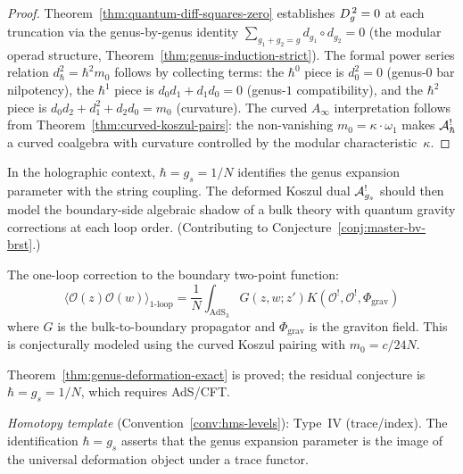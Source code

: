 \begin{proof}
Theorem~\ref{thm:quantum-diff-squares-zero} establishes
$D_{g}^{\,2} = 0$ at each truncation via the genus-by-genus
identity $\sum_{g_1+g_2=g} d_{g_1} \circ d_{g_2} = 0$
(the modular operad structure,
Theorem~\ref{thm:genus-induction-strict}).  The formal
power series relation $d_\hbar^2 = \hbar^2 m_0$ follows
by collecting terms: the $\hbar^0$ piece is $d_0^2 = 0$
(genus-$0$ bar nilpotency), the $\hbar^1$ piece is
$d_0 d_1 + d_1 d_0 = 0$ (genus-$1$ compatibility), and
the $\hbar^2$ piece is
$d_0 d_2 + d_1^2 + d_2 d_0 = m_0$ (curvature).  The
curved $A_\infty$ interpretation follows from
Theorem~\ref{thm:curved-koszul-pairs}: the
non-vanishing $m_0 = \kappa \cdot \omega_1$ makes
$\mathcal{A}^!_\hbar$ a curved coalgebra with curvature
controlled by the modular characteristic~$\kappa$.
\end{proof}

\begin{conjecture}
\label{conj:loop-string-coupling}
In the holographic context, $\hbar = g_s = 1/N$
identifies the genus expansion parameter with the string
coupling.  The deformed Koszul dual
$\mathcal{A}^!_{g_s}$ should then model the boundary-side algebraic shadow of a
bulk theory with quantum gravity corrections at each loop order.
(Contributing to Conjecture~\ref{conj:master-bv-brst}.)
\end{conjecture}

\begin{example}
The one-loop correction to the boundary two-point
function:
\[
\langle \mathcal{O}(z) \mathcal{O}(w)
\rangle_{1\text{-loop}} = \frac{1}{N}
\int_{\mathrm{AdS}_3} G(z,w;z')
K(\mathcal{O}^!, \mathcal{O}^!, \Phi_{\mathrm{grav}})
\]
where $G$ is the bulk-to-boundary propagator and
$\Phi_{\mathrm{grav}}$ is the graviton field.  This is
conjecturally modeled using the curved Koszul pairing with
$m_0 = c/24N$.
\end{example}

\begin{remark}[Scope]
Theorem~\ref{thm:genus-deformation-exact} is proved; the residual conjecture is
$\hbar = g_s = 1/N$, which requires AdS/CFT.

\emph{Homotopy template} (Convention~\ref{conv:hms-levels}): Type~IV
(trace/index).  The identification $\hbar = g_s$ asserts that the
genus expansion parameter is the image of the universal deformation
object under a trace functor.
\end{remark}

